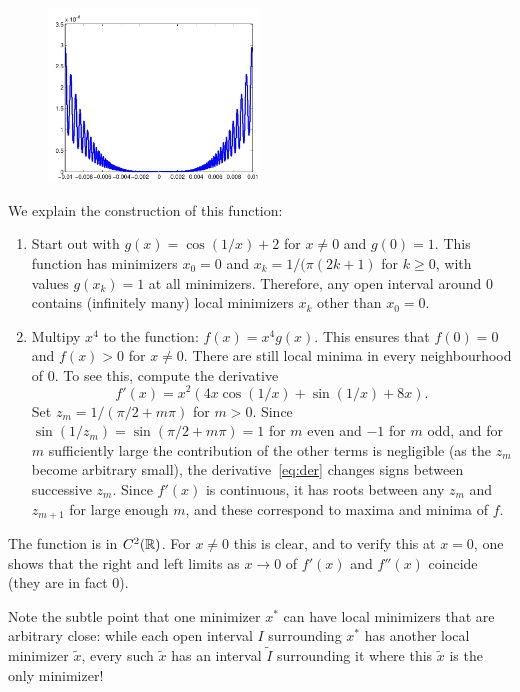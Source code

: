 \documentclass{article}
\begin{document}
\begin{itemize}
\begin{figure}[h!]
\centering
 \includegraphics[width=0.5\textwidth]{images/strictmin_cropped.pdf}
\end{figure}
We explain the construction of this function:
\begin{enumerate}
 \item Start out with $g(x) = \cos(1/x)+2$ for $x\neq 0$ and $g(0)=1$. This function has minimizers $x_0=0$ and $x_k = 1/(\pi (2k+1)$ for $k\geq 0$, with values $g(x_k)=1$ at all minimizers. Therefore, any open interval around $0$ contains (infinitely many) local minimizers $x_k$ other than $x_0=0$. 
 \item Multipy $x^4$ to the function: $f(x) = x^4g(x)$. This ensures that $f(0)=0$ and $f(x)>0$ for $x\neq 0$. There are still local minima in every neighbourhood of $0$. To see this, compute the derivative
 \begin{equation}\label{eq:der}\tag{1}
  f'(x) = x^2(4x\cos(1/x)+\sin(1/x)+8x).
 \end{equation}
 Set $z_m=1/(\pi/2+m\pi)$ for $m>0$. Since $\sin(1/z_m)=\sin(\pi/2+m\pi)= 1$ for $m$ even and $-1$ for $m$ odd, and for $m$ sufficiently large the contribution of the other terms is negligible (as the $z_m$ become arbitrary small), the derivative~\eqref{eq:der} changes signs between successive $z_m$. Since $f'(x)$ is continuous, it has roots between any $z_m$ and $z_{m+1}$ for large enough $m$, and these correspond to maxima and minima of $f$.
\end{enumerate}
The function is in $C^2(\mathbb{R})$. For $x\neq 0$ this is clear, and to verify this at $x=0$, one shows that the right and left limits as $x\to 0$ of $f'(x)$ and $f''(x)$ coincide (they are in fact $0$).

Note the subtle point that one minimizer $x^*$ can have local minimizers that are arbitrary close: while each open interval $I$ surrounding $x^*$ has another local minimizer $\tilde{x}$, every such $\tilde{x}$ has an interval $\tilde{I}$ surrounding it where this $\tilde{x}$ is the only minimizer!
\end{itemize}
\end{document}
